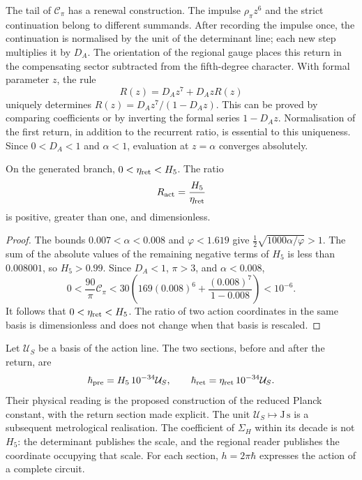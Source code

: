The tail of \(\mathcal C_\pi\) has a renewal construction.
The impulse \(\rho_\pi z^6\) and the strict continuation belong
to different summands. After recording the impulse once,
the continuation is normalised by the unit of the determinant line;
each new step multiplies it by \(D_A\). The orientation of the
regional gauge places this return in the compensating sector
subtracted from the fifth-degree character.
With formal parameter \(z\), the rule
\begin{equation}
 R(z)=D_Az^7+D_AzR(z)
 \label{vi:dep:renovacion}
\end{equation}
uniquely determines
\(R(z)=D_Az^7/(1-D_Az)\). This can be proved by comparing
coefficients or by inverting the formal series \(1-D_Az\).
Normalisation of the first return, in addition to the recurrent ratio,
is essential to this uniqueness. Since \(0<D_A<1\) and \(\alpha<1\),
evaluation at \(z=\alpha\) converges absolutely.

\begin{proposition}
\label{vi:dep:positividad-accion}
On the generated branch, \(0<\eta_{\rm ret}<H_5\). The ratio
\begin{equation}
 R_{\rm act}=\frac{H_5}{\eta_{\rm ret}}
 \label{vi:dep:Ract}
\end{equation}
is positive, greater than one, and dimensionless.
\end{proposition}
\begin{proof}
The bounds \(0.007<\alpha<0.008\) and \(\varphi<1.619\) give
\(\tfrac12\sqrt{1000\alpha/\varphi}>1\). The sum of the absolute
values of the remaining negative terms of \(H_5\) is less than
\(0.008001\), so \(H_5>0.99\).
Since \(D_A<1\), \(\pi>3\), and \(\alpha<0.008\),
\[
 0<\frac{90}{\pi}\mathcal C_\pi
 <30\left(169(0.008)^6+
                  \frac{(0.008)^7}{1-0.008}\right)<10^{-6}.
\]
It follows that \(0<\eta_{\rm ret}<H_5\). The ratio of two action
coordinates in the same basis is dimensionless and does not change when
that basis is rescaled.
\end{proof}

Let \(\mathcal U_S\) be a basis of the action line. The two
sections, before and after the return, are
\begin{equation}
 \hbar_{\rm pre}=H_5\,10^{-34}\mathcal U_S,
 \qquad
 \hbar_{\rm ret}=\eta_{\rm ret}\,10^{-34}\mathcal U_S.
 \label{vi:dep:hbar}
\end{equation}
Their physical reading is the proposed construction of the reduced Planck
constant, with the return section made explicit. The unit
\(\mathcal U_S\mapsto\mathrm{J\,s}\) is a subsequent metrological
realisation. The coefficient of \(\Sigma_H\) within its decade is not
\(H_5\): the determinant publishes the scale, and the regional reader
publishes the coordinate occupying that scale. For each section,
\(h=2\pi\hbar\) expresses the action of a complete circuit.

